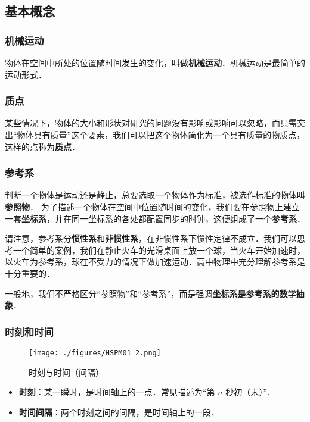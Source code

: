 

\subsection{基本概念}

\subsubsection{机械运动}
物体在空间中所处的位置随时间发生的变化，叫做\textbf{机械运动}．机械运动是最简单的运动形式．

\subsubsection{质点}
某些情况下，物体的大小和形状对研究的问题没有影响或影响可以忽略，而只需突出“物体具有质量”这个要素，我们可以把这个物体简化为一个具有质量的物质点，这样的点称为\textbf{质点}．

\subsubsection{参考系}
判断一个物体是运动还是静止，总要选取一个物体作为标准，被选作标准的物体叫\textbf{参照物}．
为了描述一个物体在空间中位置随时间的变化，我们要在参照物上建立一套\textbf{坐标系}，并在同一坐标系的各处都配置同步的时钟，这便组成了一个\textbf{参考系}．

请注意，参考系分\textbf{惯性系}和\textbf{非惯性系}，在非惯性系下惯性定律不成立．我们可以思考一个简单的案例，我们在静止火车的光滑桌面上放一个球，当火车开始加速时，以火车为参考系，球在不受力的情况下做加速运动．高中物理中充分理解参考系是十分重要的．

一般地，我们不严格区分“参照物”和“参考系”，而是强调\textbf{坐标系是参考系的数学抽象}．

\subsubsection{时刻和时间}
\begin{figure}[ht]
\centering
\texttt{[image: ./figures/HSPM01\_2.png]}
\caption{时刻与时间（间隔）} \label{HSPM01_fig2}
\end{figure}
\begin{itemize}
\item \textbf{时刻}：某一瞬时，是时间轴上的一点．常见描述为“第 $n$ 秒初（末）”．
\item \textbf{时间间隔}：两个时刻之间的间隔，是时间轴上的一段．
\end{itemize}

